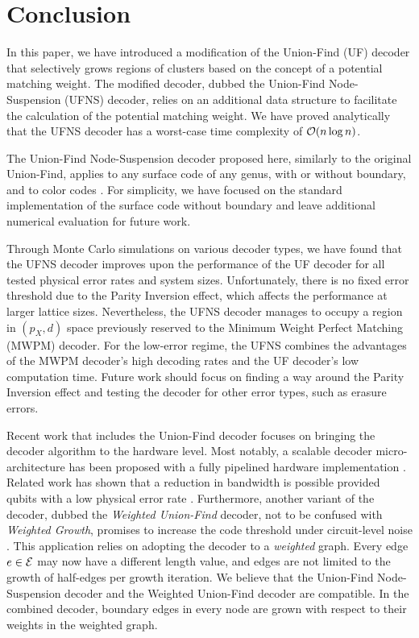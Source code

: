\section{Conclusion}\label{sec:conclusion}

In this paper, we have introduced a modification of the Union-Find (UF) decoder \cite{delfosse2017almost} that selectively grows regions of clusters based on the concept of a potential matching weight. The modified decoder, dubbed the Union-Find Node-Suspension (UFNS) decoder, relies on an additional data structure to facilitate the calculation of the potential matching weight. We have proved analytically that the UFNS decoder has a worst-case time complexity of $\mathcal{O}(n\log{n})$. 

The Union-Find Node-Suspension decoder proposed here, similarly to the original Union-Find, applies to any surface code of any genus, with or without boundary, and to color codes \cite{delfosse2017almost}. For simplicity, we have focused on the standard implementation of the surface code without boundary and leave additional numerical evaluation for future work.

Through Monte Carlo simulations on various decoder types, we have found that the UFNS decoder improves upon the performance of the UF decoder for all tested physical error rates and system sizes. Unfortunately, there is no fixed error threshold due to the Parity Inversion effect, which affects the performance at larger lattice sizes. Nevertheless, the UFNS decoder manages to occupy a region in $(p_X, d)$ space previously reserved to the Minimum Weight Perfect Matching (MWPM) decoder. For the low-error regime, the UFNS combines the advantages of the MWPM decoder's high decoding rates and the UF decoder's low computation time. Future work should focus on finding a way around the Parity Inversion effect and testing the decoder for other error types, such as erasure errors. 

Recent work that includes the Union-Find decoder focuses on bringing the decoder algorithm to the hardware level. Most notably, a scalable decoder micro-architecture has been proposed with a fully pipelined hardware implementation \cite{das2020scalable}. Related work has shown that a reduction in bandwidth is possible provided qubits with a low physical error rate \cite{delfosse2020hierarchical}. Furthermore, another variant of the decoder, dubbed the \emph{Weighted Union-Find} decoder, not to be confused with \emph{Weighted Growth}, promises to increase the code threshold under circuit-level noise \cite{huang2020fault}. This application relies on adopting the decoder to a \emph{weighted} graph. Every edge $e\in\mathcal{E}$ may now have a different length value, and edges are not limited to the growth of half-edges per growth iteration. We believe that the Union-Find Node-Suspension decoder and the Weighted Union-Find decoder are compatible. In the combined decoder, boundary edges in every node are grown with respect to their weights in the weighted graph. 

